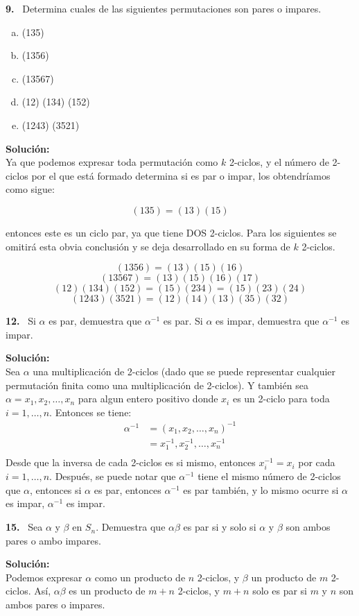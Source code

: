 \documentclass{article}
\newcounter{problem}
\newcounter{solution}
\newcommand\Problem[1]{%
  \stepcounter{problem}%
  \textbf{#1.}~%
  \setcounter{solution}{0}%
}
\newcommand\TheSolution{%
  \textbf{Solución:}\\%
}
\begin{document}
\Problem{9} Determina cuales de las siguientes permutaciones son pares o
impares.
\begin{enumerate}[a.]
	\item (135)
  \item (1356)
  \item (13567)
  \item (12) (134) (152)
  \item (1243) (3521)
\end{enumerate}

\TheSolution{}
Ya que podemos expresar toda permutación como $k$ 2-ciclos, y el número de
2-ciclos por el que está formado determina si es par o impar, los obtendríamos
como sigue:

\[
  (135)=(13)(15)
\]

entonces este es un ciclo par, ya que tiene DOS 2-ciclos. Para los siguientes
se omitirá esta obvia conclusión y se deja desarrollado en su forma de $k$
2-ciclos.

\[{(1356)} = {(13)}{(15)}{(16)}\]
\[(13567) = (13)(15)(16)(17)\]
\[(12)(134)(152) = (15)(234)=(15)(23)(24)\]
\[(1243)(3521) = (12)(14)(13)(35)(32)\]

\Problem{12} Si $\alpha$ es par, demuestra que $\alpha^{-1}$ es par. Si
$\alpha$ es impar, demuestra que $\alpha^{-1}$ es impar.

\TheSolution{}
Sea $\alpha$ una multiplicación de 2-ciclos (dado que se puede representar
cualquier permutaci\'on finita como una multiplicación de 2-ciclos). Y también
sea $\alpha = x_1,x_2,\dots,x_n$ para algun entero positivo donde $x_i$ es un
2-ciclo para toda $i=1,\dots,n$. Entonces se tiene:\\
		\begin{align*}
      \alpha^{-1} &= {(x_1,x_2,\dots,x_n)}^{-1}\\
			&= x_1^{-1}, x_2^{-1},\dots,x_n^{-1}\\
		\end{align*}
Desde que la inversa de cada 2-ciclos es si mismo, entonces $x_i^{-1} = x_i$
por cada $i=1,\dots,n$. Despu\'es, se puede notar que $\alpha^{-1}$ tiene el
mismo n\'umero de 2-ciclos que $\alpha$, entonces si $\alpha$ es par, entonces
$\alpha^{-1}$ es par tambi\'en, y lo mismo ocurre si $\alpha$ es impar,
$\alpha^{-1}$ es impar.

\Problem{15} Sea $\alpha$ y $\beta$ en $S_n$. Demuestra que $\alpha\beta$ es
par si y solo si $\alpha$ y $\beta$ son ambos pares o ambo impares.

\TheSolution{} Podemos expresar $\alpha$ como un producto de $n$ 2-ciclos, y
$\beta$ un producto de $m$ 2-ciclos. Así, $\alpha\beta$ es un producto de
$m + n$ 2-ciclos, y $m + n$ solo es par si $m$ y $n$ son ambos pares o
impares.
\end{document}
